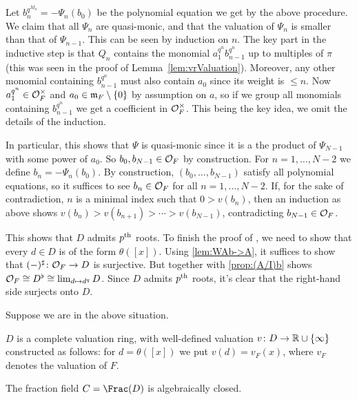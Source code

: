 \documentclass[a4paper, 10pt, oneside, DIV=9, chapterprefix=true, numbers=enddot,bibliography=totoc]{scrbook}
\begin{document}
\begin{proof*}
	Let $b_n^{q^{M_n}}=-\Psi_n(b_0)$ be the polynomial equation we get by the above procedure.	We claim that all $\Psi_n$ are quasi-monic, and that the valuation of $\Psi_n$ is smaller than that of $\Psi_{n-1}$. This can be seen by induction on $n$. The key part in the inductive step is that $Q_n$ contains the monomial $a_1^{q^n}b_{n-1}^{q^n}$ up to multiples of $\pi$ (this was seen in the proof of Lemma~\cref{lem:vrValuation}). Moreover, any other monomial containing $b_{n-1}^{q^n}$ must also contain $a_0$ since its weight is $\leq n$. Now $a_1^{q^n}\in\mathcal{O}_F^\times$ and $a_0\in\mathfrak{m}_F\setminus\{0\}$ by assumption on $a$, so if we group all monomials containing $b_{n-1}^{q^n}$ we get a coefficient in $\mathcal{O}_F^\times$. This being the key idea, we omit the details of the induction.
	
	In particular, this shows that $\Psi$ is quasi-monic since it is a the product of $\Psi_{N-1}$ with some power of $a_0$. So $b_0,b_{N-1}\in \mathcal{O}_F$ by construction. For $n=1,\dotsc,N-2$ we define $b_n=-\Psi_n(b_0)$. By construction, $(b_0,\dotsc,b_{N-1})$ satisfy all polynomial equations, so it suffices to see $b_n\in\mathcal{O}_F$ for all $n=1,\dotsc,N-2$. If, for the sake of contradiction, $n$ is a minimal index such that $0>v(b_n)$, then an induction as above shows $v(b_n)>v(b_{n+1})>\dotsb>v(b_{N-1})$, contradicting $b_{N-1}\in\mathcal{O}_F$.
	
	This shows that $D$ admits $p^{\text{th}}$ roots. To finish the proof of , we need to show that every $d\in D$ is of the form $\theta([x])$. Using \cref{lem:WAb->A}, it suffices to show that $(-)^\sharp\colon \Oo_F\morphism D$ is surjective. But  together with \cref{prop:(A/I)b} shows $\mathcal{O}_F\cong D^\flat\cong \operatorname*{lim}_{d\mapsto d^q}D$. Since $D$ admits $p^{\text{th}}$ roots, it's clear that the right-hand side surjects onto $D$.
\end{proof*}
\begin{cor}\label{cor:D}
	Suppose we are in the above situation.
	\begin{numerate}
		\item $D$ is a complete valuation ring, with well-defined valuation $v\colon D\morphism\IR\cup\{\infty\}$ constructed as follows: for $d=\theta([x])$ we put $v(d)=v_F(x)$, where $v_F$ denotes the valuation of $F$.
		\item The fraction field $C=\Frac(D)$ is algebraically closed.
	\end{numerate}
\end{cor}
\end{document}
